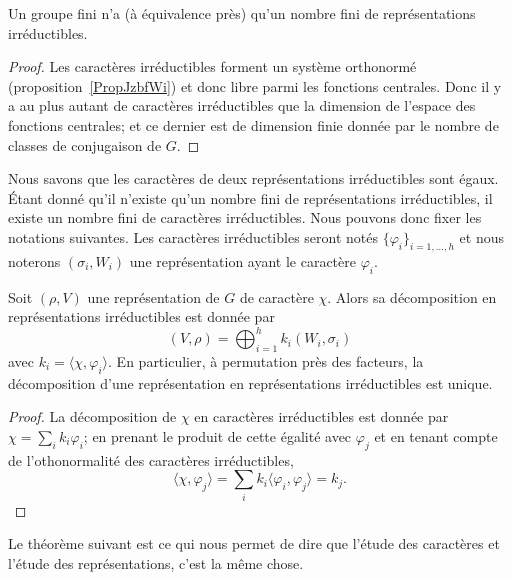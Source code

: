\begin{lemma}
    Un groupe fini n'a (à équivalence près) qu'un nombre fini de représentations irréductibles.
\end{lemma}

\begin{proof}
    Les caractères irréductibles forment un système orthonormé (proposition~\ref{PropJzbfWi}) et donc libre parmi les fonctions centrales. Donc il y a au plus autant de caractères irréductibles que la dimension de l'espace des fonctions centrales; et ce dernier est de dimension finie donnée par le nombre de classes de conjugaison de \( G\).
\end{proof}

Nous savons que les caractères de deux représentations irréductibles sont égaux. Étant donné qu'il n'existe qu'un nombre fini de représentations irréductibles, il existe un nombre fini de caractères irréductibles. Nous pouvons donc fixer les notations suivantes. Les caractères irréductibles seront notés \( \{ \varphi_i \}_{i=1,\ldots, h}\) et nous noterons \( (\sigma_i,W_i)\) une représentation ayant le caractère \( \varphi_i\).

\begin{theorem}
    Soit \( (\rho,V)\) une représentation de \( G\) de caractère \( \chi\). Alors sa décomposition en représentations irréductibles est donnée par
    \begin{equation}
        (V,\rho)=\bigoplus_{i=1}^hk_i(W_i,\sigma_i)
    \end{equation}
    avec \( k_i=\langle \chi, \varphi_i\rangle \). En particulier, à permutation près des facteurs, la décomposition d'une représentation en représentations irréductibles est unique.
\end{theorem}

\begin{proof}
    La décomposition de \( \chi\) en caractères irréductibles est donnée par \( \chi=\sum_ik_i\varphi_i\); en prenant le produit de cette égalité avec \( \varphi_j\) et en tenant compte de l'othonormalité des caractères irréductibles,
    \begin{equation}
        \langle \chi, \varphi_j\rangle =\sum_ik_i\langle \varphi_i, \varphi_j\rangle =k_j.
    \end{equation}
\end{proof}

Le théorème suivant est ce qui nous permet de dire que l'étude des caractères et l'étude des représentations, c'est la même chose.

